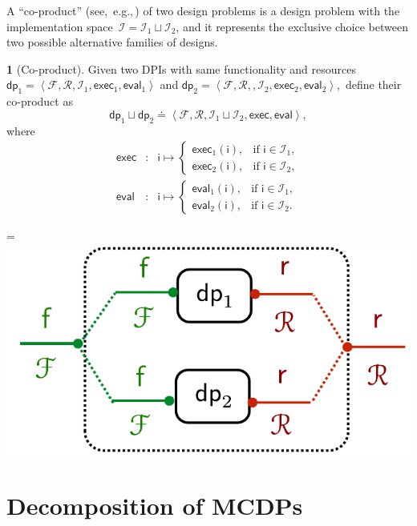 \documentclass[twocolumn,english]{IEEEtran}
\theoremstyle{definition}
\newtheorem{defn}{\protect\definitionname}
\theoremstyle{plain}
\theoremstyle{definition}
\theoremstyle{remark}
\theoremstyle{definition}
\theoremstyle{plain}
\theoremstyle{plain}
\newcommand{\eg}{{e.g.},\xspace}
\newcommand{\aword}[1]{\mathsf{#1}}
\newcommand{\vmath}[1]{\aword{#1}}
\newcommand{\funsp}{\mathscr{F}}
\newcommand{\imp}{\vmath{i}}
\newcommand{\impsp}{\mathscr{I}}
\newcommand{\exc}{\vmath{exec}}
\newcommand{\eval}{\vmath{eval}}
\newcommand{\ressp}{\mathscr{R}}
\newcommand{\dprob}{\vmath{dp}}
\newcommand*{\vcenteredhbox}[1]{\begingroup
\setbox0=\hbox{#1}\parbox{\wd0}{\box0}\endgroup}
\newcommand{\captionsideleft}[2]{
    \medskip
    \begin{minipage}{1.8cm}{
        \hfill
        \protect\captionof{figure}{#1}}\end{minipage}
    \begin{minipage}{6.6cm}
    
    \vcenteredhbox{{#2}}
    \hfill
    \end{minipage}
    \medskip
}
\providecommand{\definitionname}{Definition}
\begin{document}
A ``co-product'' (see,~\eg\,\cite[Section 2.4]{spivak14category})
of two design problems is a design problem with the implementation
space~$\impsp=\impsp_{1}\sqcup\impsp_{2}$, and it represents the
exclusive choice between two possible alternative families of designs.
\begin{defn}[Co-product]
\label{def:parallel-1}Given two DPIs with same functionality and
resources $\dprob_{1}=\left\langle \funsp,\ressp,\impsp_{1},\exc_{1},\eval_{1}\right\rangle $
and $\dprob_{2}=\left\langle \funsp,\ressp,,\impsp_{2},\exc_{2},\eval_{2}\right\rangle ,$
define their co-product as
\[
\dprob_{1}\sqcup\dprob_{2}\doteq\left\langle \funsp,\ressp,\impsp_{1}\sqcup\impsp_{2},\exc,\eval\right\rangle ,
\]
where
\begin{eqnarray}
\exc & : & \imp\mapsto\begin{cases}
\exc_{1}(\imp), & \text{if }\imp\in\impsp_{1},\\
\exc_{2}(\imp), & \text{if }\imp\in\impsp_{2},
\end{cases}\label{eq:dppar-exec-1}\\
\eval & : & \imp\mapsto\begin{cases}
\eval_{1}(\imp), & \text{if }\imp\in\impsp_{1},\\
\eval_{2}(\imp), & \text{if }\imp\in\impsp_{2}.
\end{cases}\nonumber 
\end{eqnarray}

\captionsideleft{\label{fig:dpcoproduct}}{\includegraphics[scale=0.33]{gmcdp_coproduct}}
\end{defn}

\section{Decomposition of MCDPs\label{sec:Decomposition}}
\end{document}
